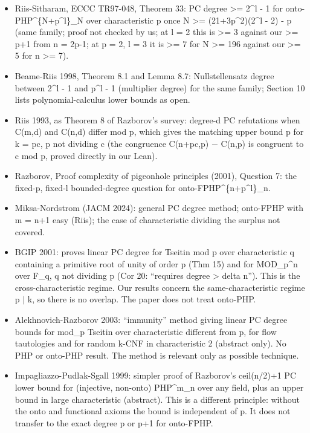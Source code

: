 \documentclass{article}
\begin{document}
\begin{itemize}
\item Riis-Sitharam, ECCC TR97-048, Theorem 33: PC degree \textgreater{}= 2\textasciicircum{}l - 1 for onto-PHP\textasciicircum{}\{N+p\textasciicircum{}l\}\_N over characteristic p once N \textgreater{}= (21+3p\textasciicircum{}2)(2\textasciicircum{}l - 2) - p (same family; proof not checked by us; at l = 2 this is \textgreater{}= 3 against our \textgreater{}= p+1 from n = 2p-1; at p = 2, l = 3 it is \textgreater{}= 7 for N \textgreater{}= 196 against our \textgreater{}= 5 for n \textgreater{}= 7).
\item Beame-Riis 1998, Theorem 8.1 and Lemma 8.7: Nullstellensatz degree between 2\textasciicircum{}l - 1 and p\textasciicircum{}l - 1 (multiplier degree) for the same family; Section 10 lists polynomial-calculus lower bounds as open.
\item Riis 1993, as Theorem 8 of Razborov's survey: degree-d PC refutations when C(m,d) and C(n,d) differ mod p, which gives the matching upper bound p for k = pc, p not dividing c (the congruence C(n+pc,p) $-$ C(n,p) is congruent to c mod p, proved directly in our Lean).
\item Razborov, Proof complexity of pigeonhole principles (2001), Question 7: the fixed-p, fixed-l bounded-degree question for onto-FPHP\textasciicircum{}\{n+p\textasciicircum{}l\}\_n.
\item Miksa-Nordstrom (JACM 2024): general PC degree method; onto-FPHP with m = n+1 easy (Riis); the case of characteristic dividing the surplus not covered.
\item BGIP 2001: proves linear PC degree for Tseitin mod p over characteristic q containing a primitive root of unity of order p (Thm 15) and for MOD\_p\textasciicircum{}n over F\_q, q not dividing p (Cor 20: ``requires degree \textgreater{} delta n''). This is the cross-characteristic regime. Our results concern the same-characteristic regime p $\mid$ k, so there is no overlap. The paper does not treat onto-PHP.
\item Alekhnovich-Razborov 2003: ``immunity'' method giving linear PC degree bounds for mod\_p Tseitin over characteristic different from p, for flow tautologies and for random k-CNF in characteristic 2 (abstract only). No PHP or onto-PHP result. The method is relevant only as possible technique.
\item Impagliazzo-Pudlak-Sgall 1999: simpler proof of Razborov's ceil(n/2)+1 PC lower bound for (injective, non-onto) PHP\textasciicircum{}m\_n over any field, plus an upper bound in large characteristic (abstract). This is a different principle: without the onto and functional axioms the bound is independent of p. It does not transfer to the exact degree p or p+1 for onto-FPHP.

\end{itemize}
\end{document}
